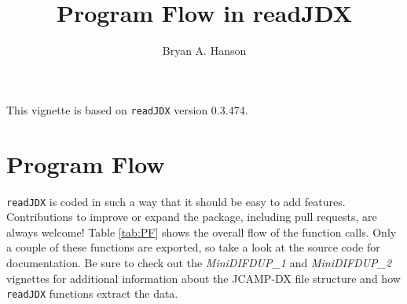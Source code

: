 \documentclass[10pt,twoside,]{pinp}
\title{Program Flow in readJDX}
\author[a]{Bryan A. Hanson}
\affil[a]{Dept. of Chemistry \& Biochemistry, DePauw University;
\url{hanson@depauw.edu}}
\begin{document}
\verticaladjustment{-2pt}

\maketitle
\thispagestyle{firststyle}



This vignette is based on \texttt{readJDX} version 0.3.474.

\hypertarget{program-flow}{%
\section{Program Flow}\label{program-flow}}

\texttt{readJDX} is coded in such a way that it should be easy to add
features. Contributions to improve or expand the package, including pull
requests, are always welcome! Table \ref{tab:PF} shows the overall flow
of the function calls. Only a couple of these functions are exported, so
take a look at the source code for documentation. Be sure to check out
the \emph{MiniDIFDUP\_1} and \emph{MiniDIFDUP\_2} vignettes for
additional information about the JCAMP-DX file structure and how
\texttt{readJDX} functions extract the data.
\end{document}
